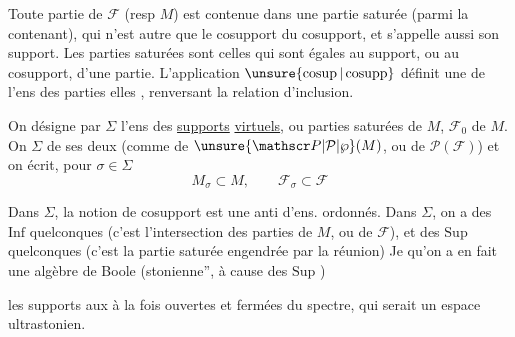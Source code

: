 Toute partie de $\mathcal F$ (resp $M$) est contenue dans une partie saturée  (parmi  la contenant), qui  n'est autre que le cosupport du cosupport, et s'appelle aussi son support. Les parties saturées sont celles qui sont égales au support, ou au cosupport, d'une partie. L'application  $\unsure{\operatorname{cosup}|\operatorname{cosupp}}$ définit une  de l'ens des parties   elles , renversant la relation d'inclusion.

On désigne par $\Sigma$ l'ens des \uline{supports} \uline{virtuels}, ou parties saturées  de $M$,   $\mathcal F_0$ de $M$.   On  $\Sigma$ de  ses deux  (comme  de $\unsure{\mathscr P|\mathcal P|\wp}(M)$, ou de $\mathscr P(\mathcal F)$) et on écrit, pour $\sigma\in\Sigma$
\[
M_\sigma\subset M,\qquad\mathcal F_\sigma\subset\mathcal F
\]

Dans $\Sigma$,  la notion de cosupport est une anti d'ens. ordonnés. Dans $\Sigma$, on a des $\mathrm{Inf}$ quelconques (c'est l'intersection des parties de $M$, ou de $\mathcal F$), et des $\mathrm{Sup}$ quelconques (c'est la partie saturée
engendrée par la réunion) Je   qu'on a en fait une algèbre de Boole (stonienne'', à cause des $\mathrm{Sup}$ )


 les supports  aux  à la fois ouvertes et fermées du spectre, qui serait un espace    ultrastonien.

